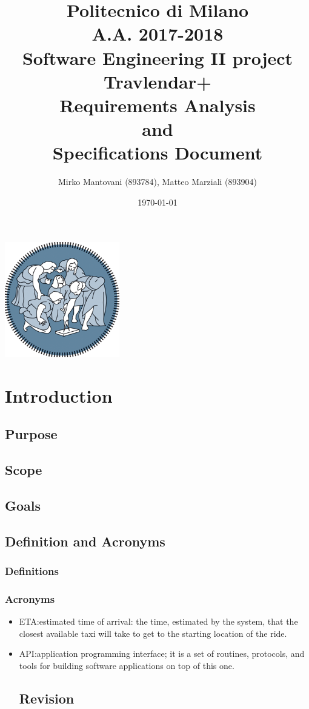 \documentclass{article}
\author{Mirko Mantovani (893784), Matteo Marziali (893904)}
\date{\today}
\title{Politecnico di Milano
	\\A.A. 2017\@-\@2018
	\\Software Engineering II project \\ \textbf{Travlendar+}
	\\\textbf{R}equirements \textbf{A}nalysis \\and\\ \textbf{S}pecifications \textbf{D}ocument}
\begin{document}
\maketitle
\begin{center}
	\includegraphics[width=5cm]{polimi-logo}
\end{center}
\clearpage
\tableofcontents
\clearpage

\section{Introduction}

\subsection{Purpose}



\newpage
\subsection{Scope}


\subsection{Goals}


\subsection{Definition and Acronyms}

\subsubsection{Definitions}


\subsubsection{Acronyms}
\begin{itemize}
	\item ETA:\@ estimated time of arrival: the time, estimated by the system, that the closest available taxi will take to get to the starting location of the ride.
	\item API:\@ application programming interface; it is a set of routines, protocols, and tools for building software applications on top of this one.
	
\subsection{Revision}


	
\end{itemize}
\end{document}
